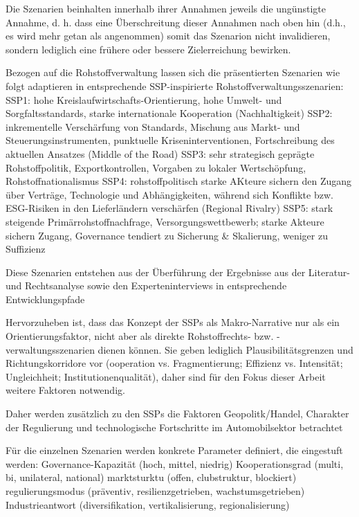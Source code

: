 \documentclass[12pt,a4paper,oneside]{book} %
\begin{document}
Die Szenarien beinhalten innerhalb ihrer Annahmen jeweils die ungünstigte Annahme, d. h. dass eine Überschreitung dieser Annahmen nach oben hin (d.h., es wird mehr getan als angenommen) somit das Szenarion nicht invalidieren, sondern lediglich eine frühere oder bessere Zielerreichung bewirken.



Bezogen auf die Rohstoffverwaltung lassen sich die präsentierten Szenarien wie folgt adaptieren in entsprechende SSP-inspirierte Rohstoffverwaltungsszenarien:
SSP1:  hohe Kreislaufwirtschafts‑Orientierung, hohe Umwelt- und Sorgfaltsstandards, starke internationale Kooperation (Nachhaltigkeit)
SSP2:  inkrementelle Verschärfung von Standards, Mischung aus Markt- und Steuerungsinstrumenten, punktuelle Kriseninterventionen, Fortschreibung des aktuellen Ansatzes (Middle of the Road)
SSP3: sehr strategisch geprägte Rohstoffpolitik, Exportkontrollen, Vorgaben zu lokaler Wertschöpfung, Rohstoffnationalismus
SSP4: rohstoffpolitisch starke AKteure sichern den Zugang über Verträge, Technologie und Abhängigkeiten, während sich Konflikte bzw. ESG-Risiken in den Lieferländern verschärfen (Regional Rivalry)
SSP5: stark steigende Primärrohstoffnachfrage, Versorgungswettbewerb; starke Akteure sichern Zugang, Governance tendiert zu Sicherung & Skalierung, weniger zu Suffizienz

Diese Szenarien entstehen aus der Überführung der Ergebnisse aus der Literatur- und Rechtsanalyse sowie den Experteninterviews in entsprechende Entwicklungspfade

Hervorzuheben ist, dass das Konzept der SSPs als Makro-Narrative nur als ein Orientierungsfaktor, nicht aber als direkte Rohstoffrechts- bzw. -verwaltungsszenarien dienen können. Sie geben lediglich Plausibilitätsgrenzen und Richtungskorridore vor (ooperation vs. Fragmentierung; Effizienz vs. Intensität; Ungleichheit; Institutionenqualität), daher sind für den Fokus dieser Arbeit weitere Faktoren notwendig.

Daher werden zusätzlich zu den SSPs die Faktoren Geopolitk/Handel, Charakter der Regulierung und technologische Fortschritte im Automobilsektor betrachtet

Für die einzelnen Szenarien werden konkrete Parameter definiert, die eingestuft werden:
Governance-Kapazität (hoch, mittel, niedrig)
Kooperationsgrad (multi, bi, unilateral, national)
marktsturktu (offen, clubstruktur, blockiert)
regulierungsmodus (präventiv, resilienzgetrieben, wachstumsgetrieben)
Industrieantwort (diversifikation, vertikalisierung, regionalisierung)
\end{document}
